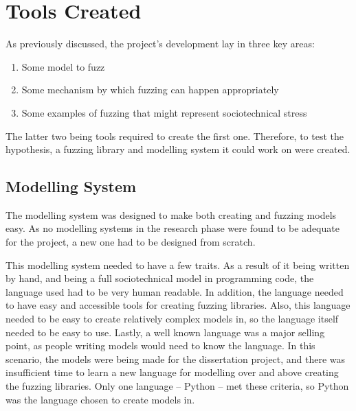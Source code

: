 \chapter{Tools Created}
\label{implementation_head}
As previously discussed, the project's development lay in three key areas: 
\begin{enumerate}
    \item Some model to fuzz
    \item Some mechanism by which fuzzing can happen appropriately
    \item Some examples of fuzzing that might represent sociotechnical stress
\end{enumerate}\par

The latter two being tools required to create the first one. Therefore, to test the hypothesis, a fuzzing library and modelling system it could work on were created. 

\section{Modelling System}
\label{model_outline}
The modelling system was designed to make both creating and fuzzing models easy. As no modelling systems in the research phase were found to be adequate for the project, a new one had to be designed from scratch.\par

This modelling system needed to have a few traits. As a result of it being written by hand, and being a full sociotechnical model in programming code, the language used had to be very human readable. In addition, the language needed to have easy and accessible tools for creating fuzzing libraries. Also, this language needed to be easy to create relatively complex models in, so the language itself needed to be easy to use. Lastly, a well known language was a major selling point, as people writing models would need to know the language. In this scenario, the models were being made for the dissertation project, and there was insufficient time to learn a new language for modelling over and above creating the fuzzing libraries. Only one language -- Python -- met these criteria, so Python was the language chosen to create models in. \par%

